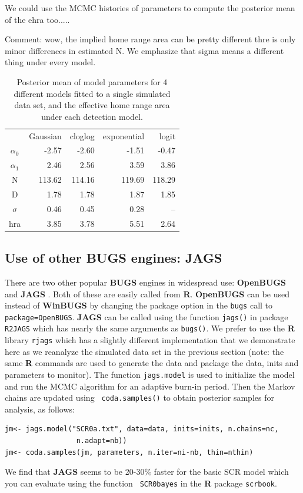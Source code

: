 We could use the MCMC histories of parameters to compute the posterior
mean of the ehra too.....

Comment: wow, the implied home range area can be pretty different thre
is only minor differences in estimated N.
We emphasize that sigma means a different thing under every model. 


\begin{table}
\centering
\caption{
Posterior mean of model parameters for 4 different models fitted to a
single simulated data set,
  and the effective home range area under each detection model.
}
\begin{tabular}{crrrr}
     &  Gaussian & cloglog &exponential & logit \\
$\alpha_0$  &  -2.57 &  -2.60 & -1.51 & -0.47 \\
$\alpha_1$  &  2.46  & 2.56  & 3.59  & 3.86 \\
N           & 113.62& 114.16 &119.69& 118.29 \\
D           & 1.78  & 1.78  & 1.87  & 1.85 \\
$\sigma$    & 0.46  & 0.45 &  0.28  &  -- \\
hra         & 3.85  & 3.78 &  5.51  & 2.64 \\
\end{tabular}
\label{scr0.tab.implied}
\end{table}





\subsection{Use of other BUGS engines: JAGS}

There are two other popular {\bf BUGS} engines in widespread use: {\bf
  OpenBUGS} \citep{thomas_etal:2006} and {\bf JAGS}
\citep{plummer:2003}. Both of these are easily called from {\bf
  R}. {\bf OpenBUGS} can be used instead of {\bf WinBUGS} by changing
the package option in the \mbox{\tt bugs} call to \mbox{\tt
  package=OpenBUGS}.  {\bf JAGS} can be called using the function
\mbox{\tt jags()} in package \mbox{\tt R2JAGS} which has nearly the
same arguments as \mbox{\tt bugs()}.  We prefer to use the {\bf R}
library \mbox{\tt rjags} \citep{plummer:2009} which has a slightly
different implementation that we demonstrate here as we reanalyze the
simulated data set in the previous section (note: the same {\bf R}
commands are used to generate the data and package the data, inits and
parameters to monitor). The function \mbox{\tt jags.model} is used to
initialize the model and run the MCMC algorithm for an adaptive
burn-in period.  Then the Markov chains are updated using \mbox{\tt
  coda.samples()} to obtain posterior samples for analysis, as
follows:
\begin{verbatim}
jm<- jags.model("SCR0a.txt", data=data, inits=inits, n.chains=nc,
                 n.adapt=nb))
jm<- coda.samples(jm, parameters, n.iter=ni-nb, thin=nthin)
\end{verbatim}
We find that {\bf JAGS} seems to be 20-30\% faster for the basic SCR
model which you can evaluate using the function \mbox{\tt
  SCR0bayes} in the {\bf R} package \mbox{\tt scrbook}.



